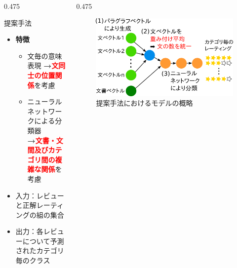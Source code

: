 \documentclass[unicode,10pt]{beamer}
\newcommand{\arrow}{\textcolor{ttiblue}{\textbf{→}}\hspace{1ex}}
\newcommand{\itemtitle}[1]{\textbf{#1}\\}
\newcommand{\fire}[1]{\textcolor{red}{\textbf{#1}}}
\newcommand{\columnsize}{0.475\textwidth}
\begin{document}
\begin{frame}
\begin{columns}[onlytextwidth,t]
\begin{column}{\columnsize}
  \begin{block}{提案手法}
    \begin{itemize}
      \item \itemtitle{特徴}
        \begin{itemize}
          \item 文毎の意味表現 \arrow \fire{文同士の位置関係}を考慮
          \item ニューラルネットワークによる分類器 \\
                \arrow \fire{文書・文間及びカテゴリ間の複雑な関係}を考慮
        \end{itemize}
      \item 入力：レビューと正解レーティングの組の集合
      \item 出力：各レビューについて予測されたカテゴリ毎のクラス
    \end{itemize}
  \end{block}
\end{column}

\begin{column}{\columnsize}
  \begin{figure}
    \includegraphics[width=\linewidth]{fig/model_with_detailed_processes.png}
    \caption{提案手法におけるモデルの概略}
  \end{figure}


\end{column}
\end{columns}
\end{frame}
\end{document}

